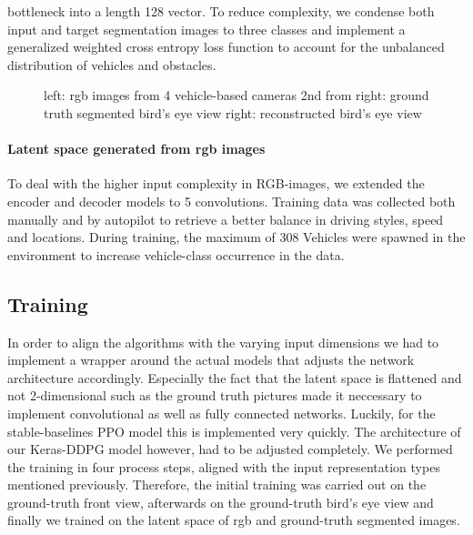 \documentclass[letterpaper, 10 pt, conference]{ieeeconf}  %
\begin{document}
bottleneck into a length 128 vector. To reduce complexity, we condense both input and target segmentation images to three classes 
and implement a generalized weighted cross entropy\cite{zhangGeneralizedCrossEntropy2018} loss function to 
account for the unbalanced distribution of vehicles and obstacles.
\begin{figure}[thpb]
   \centering
   \caption{left: rgb images from 4 vehicle-based cameras
            \newline 2nd from right: ground truth segmented bird's eye view
            \newline right: reconstructed bird's eye view}
       \label{figurelabel} 
       \end{figure}

\paragraph{Latent space generated from rgb images} To deal with the higher input complexity in RGB-images, we extended the
encoder and decoder models to 5 convolutions. Training data was collected both manually and by autopilot to retrieve a better 
balance in driving styles, speed and locations. During training, the maximum of 308 Vehicles were spawned in the environment to 
increase vehicle-class occurrence in the data. 
       
\subsection{Training}
In order to align the algorithms with the varying input dimensions we had to implement a wrapper 
around the actual models that adjusts the network architecture accordingly. Especially the fact that 
the latent space is flattened and not 2-dimensional such as the ground truth pictures made it 
neccessary to implement convolutional as well as  fully connected networks. 
Luckily, for the stable-baselines PPO model this is implemented very quickly. 
The architecture of our Keras-DDPG model however, had to be adjusted completely. 
We performed the training in four process steps, aligned with the input representation 
types mentioned previously. Therefore, the initial training was carried out on the ground-truth 
front view, afterwards on the ground-truth bird's eye view and finally we trained on the latent 
space of rgb and ground-truth segmented images. 
\end{document}
